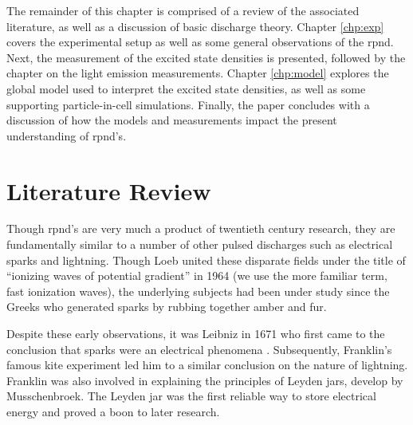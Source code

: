 The remainder of this chapter is comprised of a review of the associated
literature, as well as a discussion of basic discharge theory. Chapter
\ref{chp:exp} covers the experimental setup as well as some general observations
of the \acs{rpnd}. Next, the measurement of the excited state densities is
presented, followed by the chapter on the light emission measurements. Chapter
\ref{chp:model} explores the global model used to interpret the excited state
densities, as well as some supporting particle-in-cell simulations. Finally, the
paper concludes with a discussion of how the models and measurements impact the
present understanding of \acs{rpnd}'s.

\section{Literature Review}

Though \acs{rpnd}'s are very much a product of twentieth century research, they
are fundamentally similar to a number of other pulsed discharges such as
electrical sparks and lightning. Though Loeb united these disparate fields under
the title of ``ionizing waves of potential gradient'' in 1964 \cite{Loeb1965}
(we use the more familiar term, fast ionization waves), the underlying subjects
had been under study since the Greeks who generated sparks by rubbing together
amber and fur.

Despite these early observations, it was Leibniz in 1671 who first came to the
conclusion that sparks were an electrical phenomena \cite{Kryzhanovsky1989}.
Subsequently, Franklin's famous kite experiment led him to a similar conclusion
on the nature of lightning. Franklin was also involved in explaining the
principles of Leyden jars, develop by Musschenbroek. The Leyden jar was the
first reliable way to store electrical energy and proved a boon to later
research.

